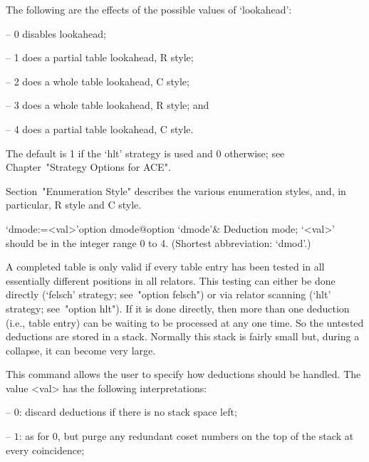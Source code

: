 The following are the effects of the possible values of `lookahead':

\beginlist%

\item{--} 0 disables lookahead;
\item{--} 1 does a partial table lookahead, R style; 
\item{--} 2 does a whole table lookahead, C style; 
\item{--} 3 does a whole table lookahead, R style; and
\item{--} 4 does a partial table lookahead, C style.  

\endlist

The default is 1 if the `hlt' strategy is used and  0  otherwise;  see
Chapter~"Strategy Options for ACE".

Section~"Enumeration Style" describes the various enumeration  styles,
and, in particular, R style and C style.

\enditems


\beginitems

\>`dmode:=<val>'{option dmode}@{option `dmode'}&
Deduction mode; `<val>' should be in the integer range 0 to 4.
(Shortest abbreviation: `dmod'.)

A completed table  is only valid if every table  entry has been tested
in all essentially different  positions in all relators.  This testing
can either be done directly (`felsch' strategy;  see~"option  felsch")
or via relator scanning (`hlt' strategy; see~"option hlt"). If  it  is
done directly, then more than one deduction (i.e., table entry) can be
waiting to be processed at any one time. So  the  untested  deductions
are stored in a stack. Normally this stack is fairly small but, during
a collapse, it can become very large.

This command allows the user  to  specify  how  deductions  should  be
handled. The value <val> has the following interpretations:

\beginlist%

\item{--} $0$:  
discard deductions if there is no stack space left;

\item{--} $1$: 
as for $0$, but purge any redundant coset numbers on the  top  of  the
stack at every coincidence;


